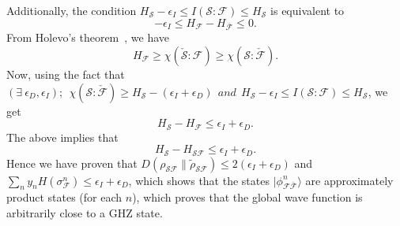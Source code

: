 \documentclass[a4paper,11pt,accepted=2024-09-14]{quantumarticle}
\newcommand{\+}         {\dagger}
\newcommand{\mc}[1]{\mathcal{#1}}
\begin{document}
Additionally, the condition $H_{\mc{S}}-\epsilon_{I} \leq I(\mc{S}:\mc{F}) \leq H_{\mc{S}}$ is equivalent to
\begin{equation}
	-\epsilon_{I} \leq  H_{\mc{F}}- H_{\bar{\mc{F}}} \leq 0.
	\label{cdtb}
\end{equation}
From Holevo's theorem~\cite{zwolak_entropy}, we have
\begin{equation}
H_{\mc{F}} \geq \chi(\check{\mc{S}}:\mc{F}) \geq \chi(\mc{S}:\check{\mc{F}}).
\end{equation}
Now, using the fact that $(\exists \  \epsilon_{D}, \epsilon_{I}); \ \ \chi(\mc{S}:\check{\mc{F}}) \geq H_{\mc{S}}-(\epsilon_{I} + \epsilon_{D}) \ \ \textit{and} \ \ H_{\mc{S}}-\epsilon_{I} \leq I(\mc{S}:\mc{F}) \leq H_{\mc{S}}$, we get
\begin{equation}
H_{\mc{S}}- H_{\mc{F}}\leq \epsilon_{I} + \epsilon_{D}.
\end{equation}
The above implies that
\begin{equation}
H_{\mc{S}}-H_{\mc{SF}} \leq \epsilon_{I} + \epsilon_{D}.
\end{equation}
Hence we have proven that $D(\rho_{\mc{SF}}\| \tilde{\rho}_{\mc{SF}}) \leq 2 (\epsilon_{I} + \epsilon_{D})$ and $\sum_{n} y_{n} H(\sigma^n_{\mc{F}}) \leq \epsilon_{I} + \epsilon_{D}$, which shows that the states $|\phi^{n}_{\mc{F}\bar{\mc{F}}}\rangle$ are approximately product states (for each $n$), which proves that the global wave function is arbitrarily close to a GHZ state.
\end{document}
